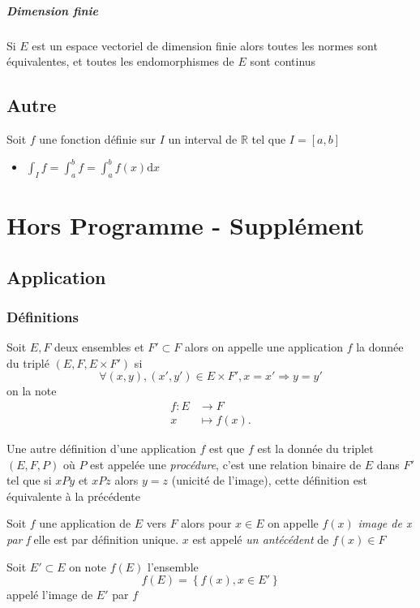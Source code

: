 \documentclass[11pt,colorlinks]{book}
\theoremstyle{mytheoremstyle}
\theoremstyle{mytheoremstyle}
\theoremstyle{mytheoremstyle}
\theoremstyle{mytheoremstyle}
\theoremstyle{mytheoremstyle}
\theoremstyle{mytheoremstyle}
\theoremstyle{mytheoremstyle}
\theoremstyle{mytheoremstyle}
\theoremstyle{myproblemstyle}
\def\mbb#1{\mathbb{#1}}
\def\bR{\mbb{R}}
\def\ev{espace vectoriel }
\newcommand{\vfunc}[5]{
  \begin{align*}
    #1 \colon #2 &\to #3\\
    #4 &\mapsto #5.
  \end{align*}
}
\begin{document}
\paragraph{Dimension finie}
\begin{definition}
  Si $E$ est un \ev de dimension finie alors toutes les normes sont équivalentes, et toutes les endomorphismes de $E$ sont continus
\end{definition}
\section{Autre}
\begin{rmq}
  Soit $f$ une fonction définie sur $I$ un interval de $\bR$ tel que $I = [a,b]$
  \begin{itemize}
    \item $\int_I f = \int_a^b f = \int_a^b f(x) \text{d}x$
  \end{itemize}
\end{rmq}




\chapter{Hors Programme - Supplément}
\section{Application}
\subsection{Définitions}
\begin{definition}
  Soit $E,F$ deux ensembles et $F' \subset F$ alors on appelle une application $f$ la donnée du triplé $(E,F,E\times F')$ si
  \begin{equation*}
    \forall (x,y),(x',y') \in E\times F', x=x' \Rightarrow y=y'
  \end{equation*}
  on la note \vfunc{f}{E}{F}{x}{f(x)}
\end{definition}
\begin{definition}
  Une autre définition d'une application $f$ est que $f$ est la donnée du triplet $(E,F,P)$ où $P$ est appelée une \textit{procédure}, c'est 
  une relation binaire de $E$ dans $F'$ tel que si $xPy$ et $xPz$ alors $y=z$ (unicité de l'image), cette définition est équivalente à la précédente
\end{definition}
\begin{definition}
  Soit $f$ une application de $E$ vers $F$ alors pour $x\in E$ on appelle $f(x)$ \textit{image de x par f} elle est par définition unique. $x$ est appelé 
  \textit{un antécédent} de $f(x) \in F$ 
\end{definition}
\begin{definition}
  Soit $E' \subset E$ on note $f(E)$ l'ensemble 
  \begin{equation*}
    f(E) = \left\{f(x), x\in E'\right\}
  \end{equation*}
  appelé l'image de $E'$ par $f$
\end{definition}
\end{document}
